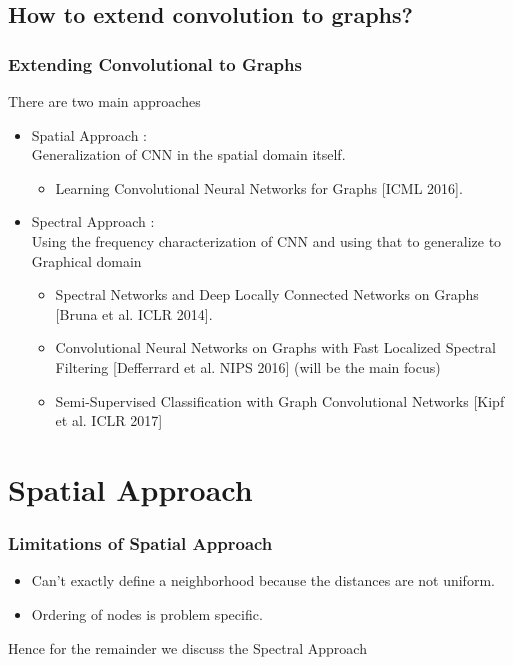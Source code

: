 \documentclass{beamer}
\begin{document}
\subsection{How to extend convolution to graphs?}
\begin{frame}
  \frametitle{Extending Convolutional to Graphs}
  There are two main approaches
  \begin{itemize}
  \item <1->Spatial Approach :\\
    Generalization of CNN in the spatial domain itself.
    \begin{itemize}
    \item <2-> Learning Convolutional Neural Networks for Graphs [ICML 2016].\cite{DBLP:journals/corr/NiepertAK16}
    \end{itemize}
  \item <3-> Spectral Approach :\\
    Using the frequency characterization of CNN and using that to generalize to Graphical domain
    \begin{itemize}
    \item <4->Spectral Networks and Deep Locally Connected Networks on Graphs [Bruna et al. ICLR 2014]. %
    \item <4->Convolutional Neural Networks on Graphs with Fast Localized Spectral Filtering [Defferrard et al. NIPS 2016] (will be the main focus) %
    \item <4->Semi-Supervised Classification with Graph Convolutional Networks [Kipf et al. ICLR 2017] %
    \end{itemize}
  \end{itemize}
\end{frame}

\section{Spatial Approach}
\begin{frame}
  \frametitle{Limitations of Spatial Approach}
  \begin{itemize}
  \item Can't exactly define a neighborhood because the distances are not uniform.
  \item Ordering of nodes is problem specific.
  \end{itemize}
  Hence for the remainder we discuss the Spectral Approach
\end{frame}
\end{document}
